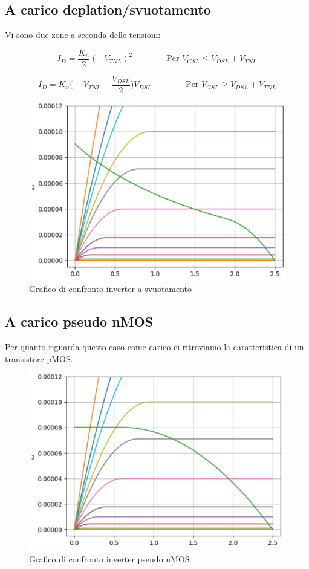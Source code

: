 \newpage
\subsection{A carico deplation/svuotamento}

Vi sono due zone a seconda delle tensioni:


\begin{equation*}
    I_D = \frac{K_n}{2}(-V_{TNL})^2  \qquad \qquad \text{Per } V_{GSL} \leq V_{DSL}  + V_{TNL}
\end{equation*}

\begin{equation*}
    I_D = K_n\biggl(-V_{TNL} - \frac{V_{DSL}}{2}\biggl)V_{DSL}  \qquad \qquad \text{Per } V_{GSL} \geq V_{DSL}  + V_{TNL}
\end{equation*}



\begin{figure}[htbp]
    \centering
    \includegraphics[width=0.5\linewidth]{img/deplation_cfr.png}
    \caption{Grafico di confronto inverter a svuotamento}
    
\end{figure}


\subsection{A carico pseudo nMOS}

Per quanto riguarda questo caso come carico ci ritroviamo la caratteristica di un transistore pMOS.

\begin{figure}[htbp]
    \centering
    \includegraphics[width=0.5\linewidth]{img/pseudo_nnone.png}
    \caption{Grafico di confronto inverter pseudo nMOS}
    
\end{figure}



